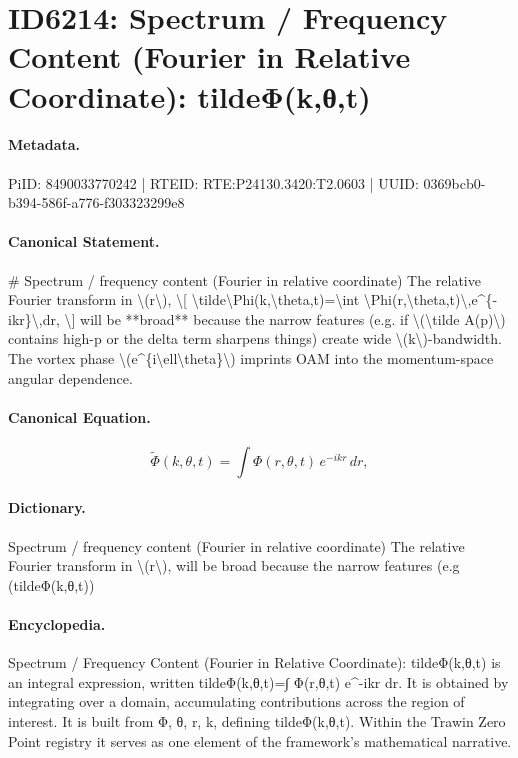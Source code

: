 \section*{ID6214: Spectrum / Frequency Content (Fourier in Relative Coordinate): tildeΦ(k,θ,t)}
\paragraph{Metadata.}
PiID: 8490033770242 | RTEID: RTE:P24130.3420:T2.0603 | UUID: 0369bcb0-b394-586f-a776-f303323299e8

\paragraph{Canonical Statement.}
\# Spectrum / frequency content (Fourier in relative coordinate) The relative Fourier transform in \textbackslash{}(r\textbackslash{}), \textbackslash{}[ \textbackslash{}tilde\textbackslash{}Phi(k,\textbackslash{}theta,t)=\textbackslash{}int \textbackslash{}Phi(r,\textbackslash{}theta,t)\textbackslash{},e\textasciicircum{}\{-ikr\}\textbackslash{},dr, \textbackslash{}] will be **broad** because the narrow features (e.g. if \textbackslash{}(\textbackslash{}tilde A(p)\textbackslash{}) contains high-p or the delta term sharpens things) create wide \textbackslash{}(k\textbackslash{})-bandwidth. The vortex phase \textbackslash{}(e\textasciicircum{}\{i\textbackslash{}ell\textbackslash{}theta\}\textbackslash{}) imprints OAM into the momentum-space angular dependence.

\paragraph{Canonical Equation.}
\[
\tilde\Phi(k,\theta,t)=\int \Phi(r,\theta,t)\,e^{-ikr}\,dr,
\]

\paragraph{Dictionary.}
Spectrum / frequency content (Fourier in relative coordinate) The relative Fourier transform in \textbackslash{}(r\textbackslash{}), will be broad because the narrow features (e.g (tildeΦ(k,θ,t))

\paragraph{Encyclopedia.}
Spectrum / Frequency Content (Fourier in Relative Coordinate): tildeΦ(k,θ,t) is an integral expression, written tildeΦ(k,θ,t)=∫ Φ(r,θ,t) e\textasciicircum{}-ikr dr. It is obtained by integrating over a domain, accumulating contributions across the region of interest. It is built from Φ, θ, r, k, defining tildeΦ(k,θ,t). Within the Trawin Zero Point registry it serves as one element of the framework's mathematical narrative.
